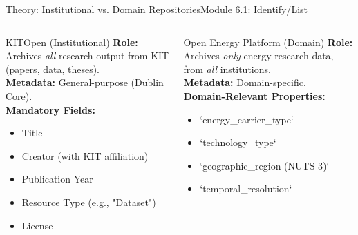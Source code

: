 \begin{frame}{Theory: Institutional vs. Domain Repositories}{Module 6.1: Identify/List}
    \begin{columns}
        \begin{block}{KITOpen (Institutional)}
            \textbf{Role:} Archives \emph{all} research output from KIT (papers, data, theses). \\
            \pause
            \textbf{Metadata:} General-purpose (Dublin Core). \\
            \pause
            \textbf{Mandatory Fields:}
            \begin{itemize}
                \item Title
                \item Creator (with KIT affiliation)
                \item Publication Year
                \item Resource Type (e.g., "Dataset")
                \item License
            \end{itemize}
        \end{block}
        
        \begin{block}{Open Energy Platform (Domain)}
            \textbf{Role:} Archives \emph{only} energy research data, from \emph{all} institutions. \\
            \pause
            \textbf{Metadata:} Domain-specific. \\
            \pause
            \textbf{Domain-Relevant Properties:}
            \begin{itemize}
                \item `energy\_carrier\_type`
                \item `technology\_type`
                \item `geographic\_region (NUTS-3)`
                \item `temporal\_resolution`
            \end{itemize}
            \vspace{3.2ex}
        \end{block}
    \end{columns}
\end{frame}

